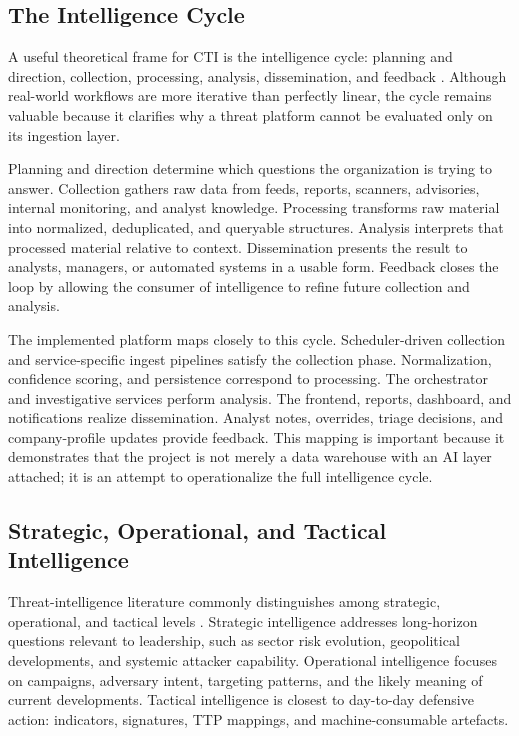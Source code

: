 \subsection{The Intelligence Cycle}
A useful theoretical frame for CTI is the intelligence cycle: planning and direction, collection, processing, analysis, dissemination, and feedback \cite{nist_cti_guide}. Although real-world workflows are more iterative than perfectly linear, the cycle remains valuable because it clarifies why a threat platform cannot be evaluated only on its ingestion layer.

Planning and direction determine which questions the organization is trying to answer. Collection gathers raw data from feeds, reports, scanners, advisories, internal monitoring, and analyst knowledge. Processing transforms raw material into normalized, deduplicated, and queryable structures. Analysis interprets that processed material relative to context. Dissemination presents the result to analysts, managers, or automated systems in a usable form. Feedback closes the loop by allowing the consumer of intelligence to refine future collection and analysis.

The implemented platform maps closely to this cycle. Scheduler-driven collection and service-specific ingest pipelines satisfy the collection phase. Normalization, confidence scoring, and persistence correspond to processing. The orchestrator and investigative services perform analysis. The frontend, reports, dashboard, and notifications realize dissemination. Analyst notes, overrides, triage decisions, and company-profile updates provide feedback. This mapping is important because it demonstrates that the project is not merely a data warehouse with an AI layer attached; it is an attempt to operationalize the full intelligence cycle.

\subsection{Strategic, Operational, and Tactical Intelligence}
Threat-intelligence literature commonly distinguishes among strategic, operational, and tactical levels \cite{nist_cti_guide}. Strategic intelligence addresses long-horizon questions relevant to leadership, such as sector risk evolution, geopolitical developments, and systemic attacker capability. Operational intelligence focuses on campaigns, adversary intent, targeting patterns, and the likely meaning of current developments. Tactical intelligence is closest to day-to-day defensive action: indicators, signatures, TTP mappings, and machine-consumable artefacts.

